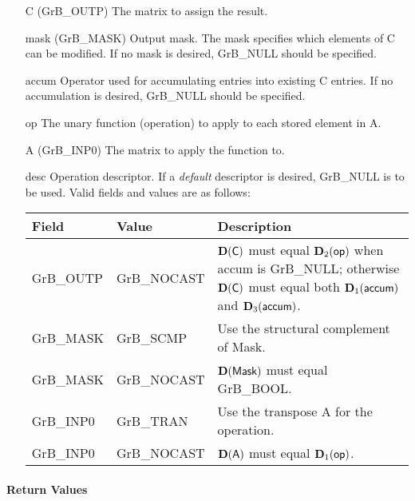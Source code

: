 \begin{itemize}[leftmargin=1.1in]
    \item[{\sf C}]     ({\sf GrB\_OUTP}) The matrix to assign the result.

    \item[{\sf mask}]  ({\sf GrB\_MASK}) Output mask. The mask
    specifies which elements of {\sf C} can be modified.
    If no mask is desired, {\sf GrB\_NULL} should be specified.

    \item[{\sf accum}]  Operator used for accumulating entries into existing {\sf C} entries. 
			If no accumulation is desired, {\sf GrB\_NULL} should be specified.

    \item[{\sf op}]    The unary function (operation) to apply to each stored element in {\sf A}.
    \item[{\sf A}]     ({\sf GrB\_INP0}) The matrix to apply the function to.
    \item[{\sf desc}]  Operation descriptor. If a
    \emph{default} descriptor is desired, {\sf GrB\_NULL} is to be
    used.  Valid fields and values are as follows: \\
    \begin{tabular}{llp{3in}}
    Field  & Value & Description \\
    \hline
    {\sf GrB\_OUTP} & {\sf GrB\_NOCAST} & $\bold{D}({\sf C})$ must equal $\bold{D}_2({\sf op})$ when
                                          {\sf accum} is {\sf GrB\_NULL}; otherwise $\bold{D}({\sf C})$
                                          must equal both $\bold{D}_1({\sf accum})$ and $\bold{D}_3({\sf accum})$. \\
    {\sf GrB\_MASK} & {\sf GrB\_SCMP}   & Use the structural complement of {\sf Mask}. \\
    {\sf GrB\_MASK} & {\sf GrB\_NOCAST} & $\bold{D}({\sf Mask})$ must equal {\sf GrB\_BOOL}. \\
    {\sf GrB\_INP0} & {\sf GrB\_TRAN}   & Use the transpose {\sf A} for the operation.\\
    {\sf GrB\_INP0} & {\sf GrB\_NOCAST} & $\bold{D}({\sf A})$ must equal $\bold{D}_1({\sf op})$.\\
    \end{tabular}
\end{itemize}

\paragraph{Return Values}

